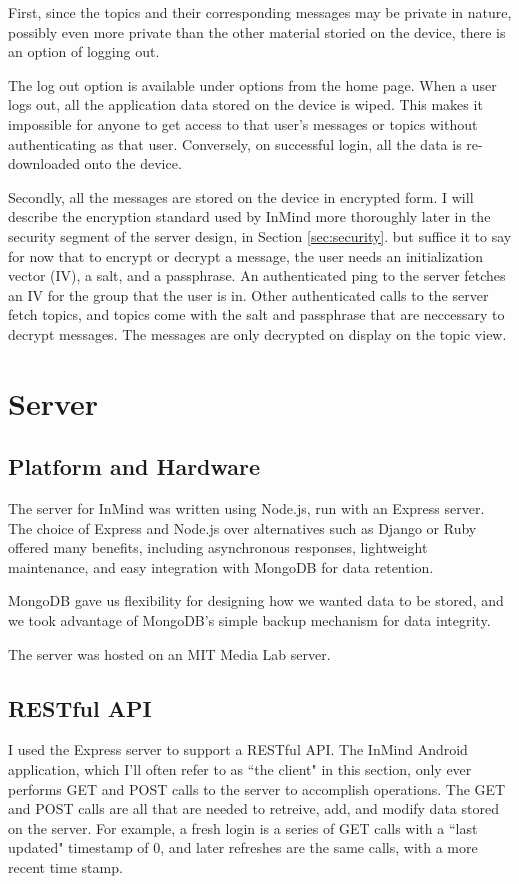       First, since the topics and their corresponding messages may be private in nature,
      possibly even more private than the other material storied on the device,
      there is an option of logging out.

      The log out option is available under options from the home page.
      When a user logs out, all the application data stored on the device is wiped.
      This makes it impossible for anyone to get access to that user's
      messages or topics without authenticating as that user.
      Conversely, on successful login, all the data is re-downloaded onto the device.

      Secondly, all the messages are stored on the device in encrypted form.
      I will describe the encryption standard used by InMind more thoroughly
      later in the security segment of the server design, in Section \ref{sec:security}.
      but suffice it to say for now that to encrypt or decrypt a message, 
      the user needs an initialization vector (IV),
      a salt, and a passphrase.
      An authenticated ping to the server fetches an IV for the group that the user is in.
      Other authenticated calls to the server fetch topics,
      and topics come with the salt and passphrase that are neccessary to decrypt messages.
      The messages are only decrypted on display on the topic view.

  \section{Server}
    \subsection{Platform and Hardware}
      The server for InMind was written using Node.js, run with an Express server.
      The choice of Express and Node.js over alternatives such as Django or Ruby
      offered many benefits, including asynchronous responses,
      lightweight maintenance, and easy integration with MongoDB for data retention.

      MongoDB gave us flexibility for designing how we wanted data to be stored,
      and we took advantage of MongoDB's simple backup mechanism for data integrity.

      The server was hosted on an MIT Media Lab server.

    \subsection{RESTful API}
      I used the Express server to support a RESTful API.
      The InMind Android application,
      which I'll often refer to as ``the client" in this section,
      only ever performs GET and POST calls to the server to accomplish operations.
      The GET and POST calls are all that are needed to
      retreive, add, and modify data stored on the server.
      For example, a fresh login is a series of GET calls with a ``last updated" timestamp
      of 0, and later refreshes are the same calls, with a more recent time stamp.

